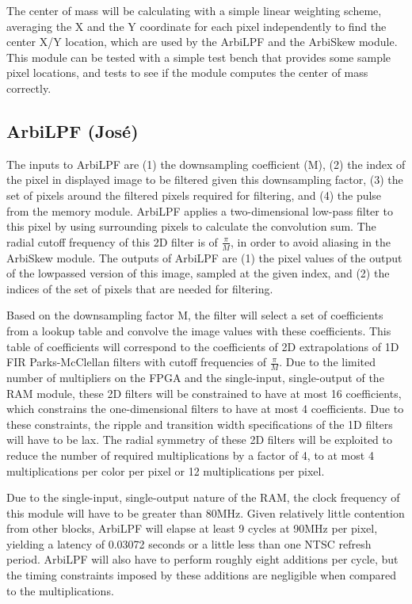 \documentclass[10pt]{article}
\begin{document}
The center of mass will be calculating with a simple linear weighting scheme, averaging the X and the Y coordinate for each pixel independently to find the center X/Y location, which are used by the ArbiLPF and the ArbiSkew module. This module can be tested with a simple test bench that provides some sample pixel locations, and tests to see if the module computes the center of mass correctly.

\subsection{ArbiLPF (Jos\'{e})}
The inputs to ArbiLPF are (1) the downsampling coefficient (M), (2) the index of the pixel in displayed image to be filtered given this downsampling factor, (3) the set of pixels around the filtered pixels required for filtering, and (4) the pulse from the memory module. ArbiLPF applies a two-dimensional low-pass filter to this pixel by using surrounding pixels to calculate the convolution sum. The radial cutoff frequency of this 2D filter is of \( \frac{\pi}{M} \), in order to avoid aliasing in the ArbiSkew module. The outputs of ArbiLPF are (1) the pixel values of the output of the lowpassed version of this image, sampled at the given index, and (2) the indices of the set of pixels that are needed for filtering.

Based on the downsampling factor M, the filter will select a set of coefficients from a lookup table and convolve the image values with these coefficients. This table of coefficients will correspond to the coefficients of 2D extrapolations of 1D FIR Parks-McClellan filters with cutoff frequencies of \( \frac{\pi}{M} \). Due to the limited number of multipliers on the FPGA and the single-input, single-output of the RAM module, these 2D filters will be constrained to have at most 16 coefficients, which constrains the one-dimensional filters to have at most 4 coefficients. Due to these constraints, the ripple and transition width specifications of the 1D filters will have to be lax. The radial symmetry of these 2D filters will be exploited to reduce the number of required multiplications by a factor of 4, to at most 4 multiplications per color per pixel or 12 multiplications per pixel.

Due to the single-input, single-output nature of the RAM, the clock frequency of this module will have to be greater than 80MHz. Given relatively little contention from other blocks, ArbiLPF will elapse at least 9 cycles at 90MHz per pixel, yielding a latency of 0.03072 seconds or a little less than one NTSC refresh period. ArbiLPF will also have to perform roughly eight additions per cycle, but the timing constraints imposed by these additions are negligible when compared to the multiplications.
\end{document}
